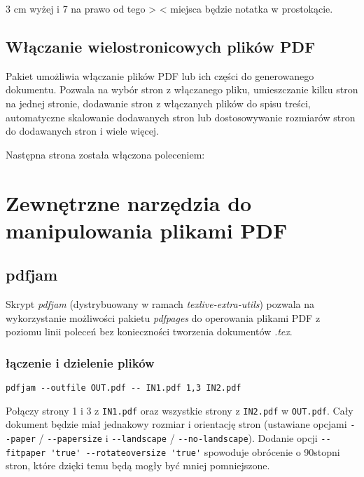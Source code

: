 \documentclass[fontSize=10pt, rmargin=3cm, extra]{pdfArticle}
\begin{document}
3 cm wyżej i 7 na prawo od tego >  < miejsca będzie notatka w prostokącie.

\subsection{Włączanie wielostronicowych plików PDF}

Pakiet  umożliwia włączanie plików PDF lub ich części do generowanego dokumentu. Pozwala na wybór stron z włączanego pliku, umieszczanie kilku stron na jednej stronie, dodawanie stron z włączanych plików do spisu treści, automatyczne skalowanie dodawanych stron lub dostosowywanie rozmiarów stron do dodawanych stron i wiele więcej.

Następna strona została włączona poleceniem:

\begin{CatchExample}

\end{CatchExample}

\putExampleVerbatimAdjust

\putExampleTeX


\section{Zewnętrzne narzędzia do manipulowania plikami PDF}

\subsection{pdfjam}

Skrypt \textit{pdfjam} (dystrybuowany w ramach \textit{texlive-extra-utils}) pozwala na wykorzystanie możliwości pakietu \textit{pdfpages} do operowania plikami PDF z poziomu linii poleceń bez konieczności tworzenia dokumentów \textit{.tex}.

\subsubsection{łączenie i dzielenie plików}

\begin{verbatim}
pdfjam --outfile OUT.pdf -- IN1.pdf 1,3 IN2.pdf
\end{verbatim}
Połączy strony 1 i 3 z \Verb$IN1.pdf$ oraz wszystkie strony z \Verb$IN2.pdf$ w \Verb$OUT.pdf$.
Cały dokument będzie miał jednakowy rozmiar i orientację stron (ustawiane opcjami \Verb$--paper$ / \Verb$--papersize$ i \Verb$--landscape$ / \Verb$--no-landscape$).
Dodanie opcji \Verb$--fitpaper 'true' --rotateoversize 'true'$ spowoduje obrócenie o 90stopni stron, które dzięki temu będą mogły być mniej pomniejszone.
\end{document}
